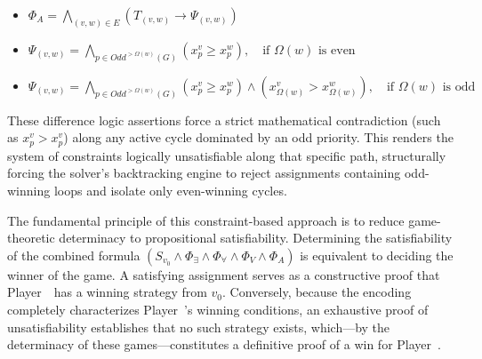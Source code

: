 \documentclass[preprint,12pt,authoryear]{elsarticle}
\begin{document}
\begin{itemize}
    \item $\Phi_A = \bigwedge_{(v,w) \in E} \left(T_{(v,w)} \rightarrow \Psi_{(v,w)}\right)$
    \item $\Psi_{(v,w)} = \bigwedge_{p \in \textit{Odd}^{>\Omega(w)}(G)} (x_p^v \geqslant x_p^w), \quad \text{if } \Omega(w) \text{ is even}$
    \item $\Psi_{(v,w)} = \bigwedge_{p \in \textit{Odd}^{>\Omega(w)}(G)} (x_p^v \geqslant x_p^w) \land (x_{\Omega(w)}^v > x_{\Omega(w)}^w), \quad \text{if } \Omega(w) \text{ is odd}$
\end{itemize}
These difference logic assertions force a strict mathematical contradiction (such as $x_p^v > x_p^v$) along any active cycle dominated by an odd priority. This renders the system of constraints logically unsatisfiable along that specific path, structurally forcing the solver's backtracking engine to reject assignments containing odd-winning loops and isolate only even-winning cycles.

The fundamental principle of this constraint-based approach is to reduce game-theoretic determinacy to propositional satisfiability. Determining the satisfiability of the combined formula $(S_{v_0} \wedge \Phi_{\exists} \wedge \Phi_{\forall} \wedge \Phi_V \wedge \Phi_A)$ is equivalent to deciding the winner of the game. A satisfying assignment serves as a constructive proof that Player~\even\ has a winning strategy from $v_0$. Conversely, because the encoding completely characterizes Player~\even's winning conditions, an exhaustive proof of unsatisfiability establishes that no such strategy exists, which—by the determinacy of these games—constitutes a definitive proof of a win for Player~\odd.
\end{document}
